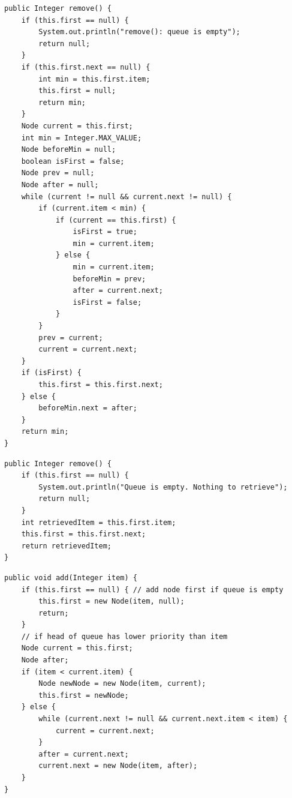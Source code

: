 \documentclass[a4paper,11pt]{article}
\newenvironment{code}{\captionsetup{type=listing}}{}
\begin{document}
\begin{code}
    \label{code:ListQueueRemove}
    \begin{verbatim}
public Integer remove() {
    if (this.first == null) {
        System.out.println("remove(): queue is empty");
        return null;
    }
    if (this.first.next == null) {
        int min = this.first.item;
        this.first = null;
        return min;
    }
    Node current = this.first;
    int min = Integer.MAX_VALUE;
    Node beforeMin = null;
    boolean isFirst = false;
    Node prev = null;
    Node after = null;
    while (current != null && current.next != null) {
        if (current.item < min) {
            if (current == this.first) {
                isFirst = true;
                min = current.item;
            } else {
                min = current.item;
                beforeMin = prev;
                after = current.next;
                isFirst = false;
            }
        }
        prev = current;
        current = current.next;
    }
    if (isFirst) {
        this.first = this.first.next;
    } else {
        beforeMin.next = after;
    }
    return min;
}

    \end{verbatim}
\end{code}

\begin{code}
    \label{code:QueueListRemove}
    \begin{verbatim}
public Integer remove() {
    if (this.first == null) {
        System.out.println("Queue is empty. Nothing to retrieve");
        return null;
    }
    int retrievedItem = this.first.item;
    this.first = this.first.next;
    return retrievedItem;
}
    \end{verbatim}
\end{code}

\begin{code}
    \label{code:QueueListAdd}
    \begin{verbatim}
public void add(Integer item) {
    if (this.first == null) { // add node first if queue is empty
        this.first = new Node(item, null);
        return;
    }
    // if head of queue has lower priority than item
    Node current = this.first;
    Node after;
    if (item < current.item) {
        Node newNode = new Node(item, current);
        this.first = newNode;
    } else {
        while (current.next != null && current.next.item < item) {
            current = current.next;
        }
        after = current.next;
        current.next = new Node(item, after);
    }
}
    \end{verbatim}
\end{code}
\end{document}

